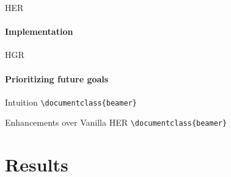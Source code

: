 \documentclass{beamer}
\begin{document}
      \begin{frame}[fragile]{HER}
            \framesubtitle{Implementation}

      \end{frame}



      \begin{frame}[fragile]{HGR}
            \framesubtitle{Prioritizing future goals}
            \begin{block}{Intuition}
                  \verb|\documentclass{beamer}|\\
            \end{block}
            \begin{block}{Enhancements over Vanilla HER}
                  \verb|\documentclass{beamer}|\\
            \end{block}
      \end{frame}


\section{Results}

\backmatter
\end{document}

